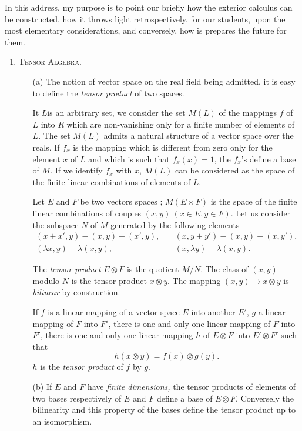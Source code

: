 In this address, my purpose is to point our briefly how the exterior
calculus can be constructed, how it throws light retrospectively, for
our students, upon the most elementary considerations, and conversely,
how is prepares the future for them. 
\begin{enumerate}
\item \textsc{Tensor Algebra.}
\begin{itemize}
\item[(a)] The notion of vector space on the
  real field being admitted, it is easy to define the \textit{tensor
    product} of two spaces.

It $L$\pageoriginale is an arbitrary set, we consider the set $M(L)$
of the mappings $f$ of $L$ into $R$ which are non-vanishing only for a
finite number of elements of $L$. The set $M(L)$ admits a natural
structure of a vector space over the reals. If $f_x$ is the mapping
which is different from zero only for the element $x$ of $L$ and which
is such that $f_x(x) =1$, the $f_x$'s define a base of $M$. If we
identify $f_x$ with $x$, $M(L)$ can be considered as the space of the
finite linear combinations of elements of $L$.

Let $E$ and $F$ be two vectors spaces ; $M(E \times F)$ is the space
of the finite linear combinations of couples $(x,y) ~ (x \in E, y \in
F)$. Let us consider the subspace $N$ of $M$ generated by the
following elements
\begin{align*}
(x+x',y) - (x,y) - (x', y), &\quad (x,y + y') - (x,y) - (x, y'),\\
(\lambda x, y) - \lambda (x,y), & \quad(x, \lambda y) - \lambda (x,y).
\end{align*}

The \textit{tensor product} $E \otimes F$ is the quotient $M/N$. The
class of $(x,y)$ modulo $N$ is the tensor product $x \otimes y$. The
mapping $(x,y) \to x \otimes y$ is \textit{bilinear} by construction.

If $f$ is a linear mapping of a vector space $E$ into another $E'$,
$g$ a linear mapping of $F$ into $F'$, there is one and only one
linear mapping of $F$ into $F'$, there is one and only one linear
mapping $h$ of $E\otimes F$ into $E' \otimes F'$ such that 
$$
h (x \otimes y) = f(x) \otimes g(y).
$$
$h$ is the \textit{tensor product} of $f$ by $g$.

\item[(b)] If $E$ and $F$ have \textit{finite dimensions,} the tensor
  products of elements of two bases respectively of $E$ and $F$ define
  a base of $E \otimes F$. Conversely the bilinearity and this
  property of the bases define the tensor product up to an
  isomorphism. 


\end{itemize}
\end{enumerate}
